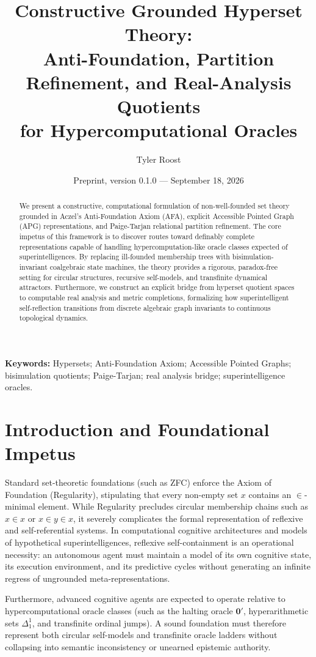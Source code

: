 \documentclass[11pt]{article}
\title{Constructive Grounded Hyperset Theory:\\Anti-Foundation, Partition Refinement, and Real-Analysis Quotients\\for Hypercomputational Oracles}
\author{Tyler Roost}
\date{Preprint, version 0.1.0 --- September 18, 2026}
\theoremstyle{definition}
\begin{document}
\maketitle

\begin{abstract}
We present a constructive, computational formulation of non-well-founded set theory grounded in Aczel's Anti-Foundation Axiom (AFA), explicit Accessible Pointed Graph (APG) representations, and Paige-Tarjan relational partition refinement. The core impetus of this framework is to discover routes toward definably complete representations capable of handling hypercomputation-like oracle classes expected of superintelligences. By replacing ill-founded membership trees with bisimulation-invariant coalgebraic state machines, the theory provides a rigorous, paradox-free setting for circular structures, recursive self-models, and transfinite dynamical attractors. Furthermore, we construct an explicit bridge from hyperset quotient spaces to computable real analysis and metric completions, formalizing how superintelligent self-reflection transitions from discrete algebraic graph invariants to continuous topological dynamics.
\end{abstract}

\noindent\textbf{Keywords:} Hypersets; Anti-Foundation Axiom; Accessible Pointed Graphs; bisimulation quotients; Paige-Tarjan; real analysis bridge; superintelligence oracles.

\section{Introduction and Foundational Impetus}
Standard set-theoretic foundations (such as ZFC) enforce the Axiom of Foundation (Regularity), stipulating that every non-empty set $x$ contains an $\in$-minimal element. While Regularity precludes circular membership chains such as $x \in x$ or $x \in y \in x$, it severely complicates the formal representation of reflexive and self-referential systems. In computational cognitive architectures and models of hypothetical superintelligences, reflexive self-containment is an operational necessity: an autonomous agent must maintain a model of its own cognitive state, its execution environment, and its predictive cycles without generating an infinite regress of ungrounded meta-representations.

Furthermore, advanced cognitive agents are expected to operate relative to hypercomputational oracle classes (such as the halting oracle $\mathbf{0}'$, hyperarithmetic sets $\Delta^1_1$, and transfinite ordinal jumps). A sound foundation must therefore represent both circular self-models and transfinite oracle ladders without collapsing into semantic inconsistency or unearned epistemic authority.
\end{document}
